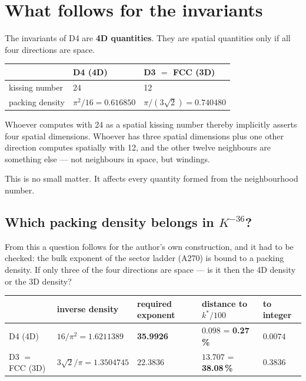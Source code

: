 \chapter{What follows for the invariants}

The invariants of D4 are \textbf{4D quantities}. They are spatial
quantities only if all four directions are space.

\begin{center}
\begin{tabular}{lll}
\toprule
 & D4 (4D) & D3 $=$ FCC (3D) \\
\midrule
kissing number & 24 & 12 \\
packing density & $\pi^2/16 = 0.616850$ & $\pi/(3\sqrt2) = 0.740480$ \\
\bottomrule
\end{tabular}
\end{center}

Whoever computes with 24 as a spatial kissing number thereby implicitly
asserts four spatial dimensions. Whoever has three spatial dimensions
plus one other direction computes spatially with 12, and the other
twelve neighbours are something else --- not neighbours in space, but
windings.

This is no small matter. It affects every quantity formed from the
neighbourhood number.

\section{Which packing density belongs in \texorpdfstring{$K^{-36}$}{K to the -36}?}

From this a question follows for the author's own construction, and it
had to be checked: the bulk exponent of the sector ladder (A270) is
bound to a packing density. If only three of the four directions are
space --- is it then the 4D density or the 3D density?

\begin{center}
\small
\begin{tabular}{lllll}
\toprule
 & inverse density & required exponent
 & distance to $k^*/100$ & to integer \\
\midrule
D4 (4D) & $16/\pi^2 = 1.6211389$ & \textbf{35.9926}
  & $0.098$ = \textbf{0.27\,\%} & $0.0074$ \\
D3 $=$ FCC (3D) & $3\sqrt2/\pi = 1.3504745$ & $22.3836$
  & $13.707$ = \textbf{38.08\,\%} & $0.3836$ \\
\bottomrule
\end{tabular}
\end{center}

